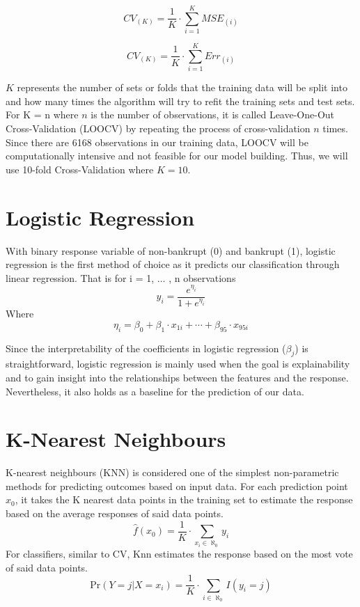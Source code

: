 \documentclass[12pt]{report}
\begin{document}
\begin{equation}
    CV_{(K)} = \frac{1}{K}\cdot\sum^{K}_{i=1}MSE_{(i)}
\end{equation}

\begin{equation}
    CV_{(K)} = \frac{1}{K}\cdot\sum^{K}_{i=1}Err_{(i)}
\end{equation}

$K$ represents the number of sets or folds that the training data will be split into and how many times the algorithm will try to refit the training sets and test sets. For K = n where $n$ is the number of observations, it is called Leave-One-Out Cross-Validation (LOOCV) by repeating the process of cross-validation $n$ times. Since there are 6168 observations in our training data, LOOCV will be computationally intensive and not feasible for our model building. Thus, we will use 10-fold Cross-Validation where $K = 10$.

\section{Logistic Regression}
With binary response variable of non-bankrupt (0) and bankrupt (1), logistic regression is the first method of choice as it predicts our classification through linear regression. That is for i = 1, $\hdots$ , n observations
\begin{equation}
    y_i = \frac{e^{\eta_i}}{1+e^{\eta_i}}
\end{equation}
Where
\begin{equation}
    \eta_i = \beta_0+\beta_1\cdot x_{1i}+\cdots+\beta_{95}\cdot x_{95i}
\end{equation}

Since the interpretability of the coefficients in logistic regression ($\beta_{j}$) is straightforward, logistic regression is mainly used when the goal is explainability and to gain insight into the relationships between the features and the response. Nevertheless, it also holds as a baseline for the prediction of our data.

\section{K-Nearest Neighbours}

K-nearest neighbours (KNN) is considered one of the simplest non-parametric methods for predicting outcomes based on input data. For each prediction point $x_{0}$, it takes the K nearest data points in the training set to estimate the response based on the average responses of said data points. 
\begin{equation}
    \hat{f}(x_{0}) = \frac{1}{K}\cdot\sum_{x_{i}\in \aleph_{0}} y_{i}
\end{equation}
For classifiers, similar to CV, Knn estimates the response based on the most vote of said data points.
\begin{equation}
    \text{Pr}(Y=j|X=x_i) = \frac{1}{K}\cdot\sum_{i\in \aleph_{0}}I(y_i=j)
\end{equation}
\end{document}
